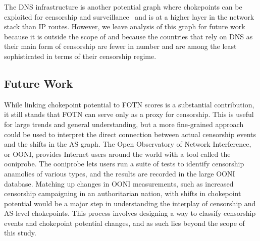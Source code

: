 The DNS infrastructure is another potential graph where chokepoints can be
exploited for censorship and surveillance~\cite{Greschbach2016a} and is at a
higher layer in the network stack than IP routes.  However, we leave analysis of
this graph for future work because it is outside the scope of \toolname{} and
because the countries that rely on DNS as their main form of censorship are
fewer in number and are among the least sophisticated in terms of their
censorship regime.

\subsection{Future Work}
While linking chokepoint potential to FOTN scores is a substantial contribution, it still stands that FOTN can serve only as a proxy for censorship.
This is useful for large trends and general understanding, but a more fine-grained approach could be used to interpret the direct connection between
actual censorship events and the shifts in the AS graph. The Open Observatory of Network Interference, or OONI, \cite{OONI} provides Internet users around
the world with a tool called the ooniprobe. The ooniprobe lets users run a suite of tests to identify censorship anamolies of various types, and the results are
recorded in the large OONI database. Matching up changes in OONI measurements, such as increased censorship campaigning in an authoritarian nation, with shifts
in chokepoint potential would be a major step in understanding the interplay of censorship and AS-level chokepoints. This process involves designing a way to classify
censorship events and chokepoint potential changes, and as such lies beyond the scope of this study.

